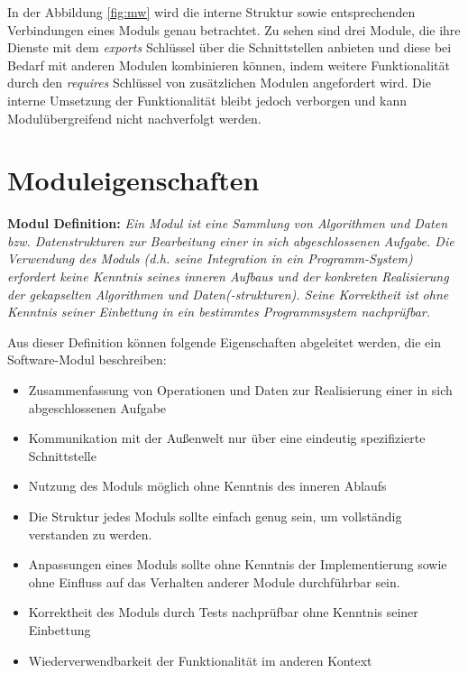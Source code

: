     In der Abbildung \ref{fig:mw} wird die interne Struktur sowie entsprechenden Verbindungen eines Moduls genau betrachtet. Zu sehen sind drei Module, die ihre Dienste mit dem \textit{exports} Schlüssel über die Schnittstellen anbieten und diese bei Bedarf mit anderen Modulen kombinieren können, indem weitere Funktionalität durch den \textit{requires} Schlüssel von zusätzlichen Modulen angefordert wird. Die interne Umsetzung der Funktionalität bleibt jedoch verborgen und kann Modulübergreifend nicht nachverfolgt werden. 

  \section{Moduleigenschaften} \label{sec:ME}

    \textbf{Modul Definition: } \textit {Ein Modul ist eine Sammlung von Algorithmen und Daten bzw. Datenstrukturen zur Bearbeitung einer in sich abgeschlossenen Aufgabe. Die Verwendung des Moduls (d.h. seine Integration in ein Programm-System) erfordert keine Kenntnis seines inneren Aufbaus und der konkreten Realisierung der gekapselten Algorithmen und Daten(-strukturen). Seine Korrektheit ist ohne Kenntnis seiner Einbettung in ein bestimmtes Programmsystem nachprüfbar.} \cite{rechenberg2006informatik}\bigbreak 

    Aus dieser Definition können folgende Eigenschaften abgeleitet werden, die ein Software-Modul beschreiben:

    \begin{itemize}
      \item Zusammenfassung von Operationen und Daten zur Realisierung einer in sich abgeschlossenen Aufgabe 
      \item Kommunikation mit der Außenwelt nur über eine eindeutig spezifizierte Schnittstelle 
      \item Nutzung des Moduls möglich ohne Kenntnis des inneren Ablaufs 
      \item Die Struktur jedes Moduls sollte einfach genug sein, um vollständig verstanden zu werden.
      \item Anpassungen eines Moduls sollte ohne Kenntnis der Implementierung sowie ohne Einfluss auf das Verhalten anderer Module durchführbar sein.
      \item Korrektheit des Moduls durch Tests nachprüfbar ohne Kenntnis seiner Einbettung
      \item Wiederverwendbarkeit der Funktionalität im anderen Kontext
    \end{itemize}

